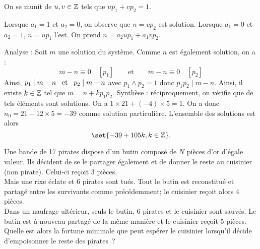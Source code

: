 \documentclass{magnolia}
\begin{document}
\begin{sol}
\begin{questions}
\question On se munit de $u,v\in \mathbb{Z}$ tels que $up_1+vp_2=1$.
  \begin{questions}
  \question Lorsque $a_1=1$ et
    $a_2=0$, on observe que $n=vp_2$ est solution. Lorsque $a_1=0$ et $a_2=1$, $n=up_1$ l'est.
  \question On prend $n=a_2up_1+a_1vp_2$.
  \end{questions}
\question Analyse : Soit $m$ une solution du système. Comme $n$ est également solution, on a :
  \[m-n\equiv 0 \quad [p_1] \qquad \text{et} \qquad m-n\equiv 0 \quad [p_2]\]
  Ainsi, $p_1\mid m-n \quad\!\text{et}\quad\! p_2\mid m-n$ avec $p_1\wedge p_2=1$ donc $p_1p_2\mid m-n$. Ainsi, il existe $k\in \mathbb{Z}$ tel que $m=n+kp_1p_2$.
  Synthèse : réciproquement, on vérifie que de tels éléments sont solutions.
 On a $1\times 21+(-4)\times 5=1$. On a donc $n_0=21-12\times 5=-39$ comme solution particulière. L'ensemble des solutions est alors $$\set{-39+105k, k\in \Z}.$$
\end{questions}
\end{sol}

Une bande de 17 pirates dispose d'un butin composé de $N$ pièces d'or d'égale
valeur. Ils décident de se le partager également et de donner le reste au
cuisinier (non pirate). Celui-ci reçoit 3 pièces.\\
Mais une rixe éclate et 6 pirates sont tués. Tout le butin est reconstitué et
partagé entre les survivants comme précédemment; le cuisinier reçoit alors
4 pièces.\\
Dans un naufrage ultérieur, seuls le butin, 6 pirates et le cuisinier sont
sauvés. Le butin est à nouveau partagé de la même manière et le cuisinier
reçoit 5 pièces.\\
Quelle est alors la fortune minimale que peut espérer le cuisinier lorsqu'il
décide d'empoisonner le reste des pirates~?
\end{document}
